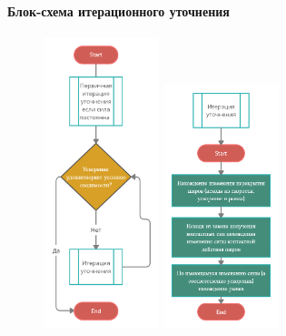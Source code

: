 \documentclass[c]{beamer}  %
\begin{document}
\begin{frame}
\frametitle{\insertsection} 
\framesubtitle{Блок-схема итерационного уточнения}
\begin{figure}[h!]
	\centering
	\includegraphics[width=0.3\textwidth]{iter_cicle} 
	\includegraphics[width=0.3\textwidth]{iter_one}
	\label{pic:iter}
\end{figure} 

\end{frame}
\end{document}
